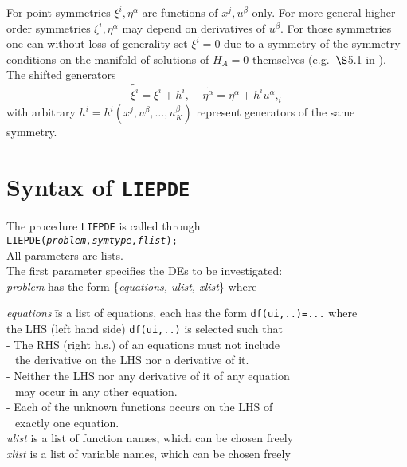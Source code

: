 \documentclass[12pt]{article}
\begin{document}
For point symmetries $\xi^i, \eta^\alpha$ are functions of $x^j,
u^\beta$ only. For more general higher order symmetries $\xi^i, \eta^\alpha$
may depend on derivatives of $u^\beta$. For those symmetries one can
without loss of generality set $\xi^i=0$ due to a symmetry of the symmetry
conditions on the manifold of solutions of $H_A=0$
themselves (e.g.\ $\S$5.1 in \cite{Olv}). The shifted generators
\[\tilde{\xi^i} = \xi^i + h^i, \; \; \; \; 
  \tilde{\eta^{\alpha}} = \eta^{\alpha} + h^i u^{\alpha},_i\]
with arbitrary $h^i=h^i(x^j, u^{\beta},\ldots, u^{\beta}_K)$
represent generators of the same symmetry. 

\section{Syntax of {\tt LIEPDE}}
The procedure {\tt LIEPDE} is called through \\
{\tt LIEPDE({\it problem,symtype,flist}); } \\
All parameters are lists. \vspace{6pt} \\
The first parameter specifies the DEs to be investigated: \\
{\it problem} has the form \{{\it equations, ulist, xlist}\} where
\begin{tabbing}
\hspace{0.5cm}
 {\it equations } \=  is a list of equations,
              each has the form {\tt df(ui,..)=...} where \\
       \> the LHS (left hand side) {\tt df(ui,..)} is selected such that \\
       \>  - The RHS (right h.s.) of an equations must not include     \\
       \>$\;\,$ the derivative on the LHS nor a derivative of it.  \\
       \>  - Neither the LHS nor any derivative of it of any equation \\
       \>$\;\,$ may occur in any other equation.\\
       \>  - Each of the unknown functions occurs on the LHS of \\
       \>$\;\,$ exactly one equation.  \\
\hspace{0.5cm}
 {\it ulist} \>  is a list of function names, which can be chosen freely \\
\hspace{0.5cm}
 {\it xlist}  \>  is a list of variable names, which can be chosen freely 
\end{tabbing}
\end{document}
